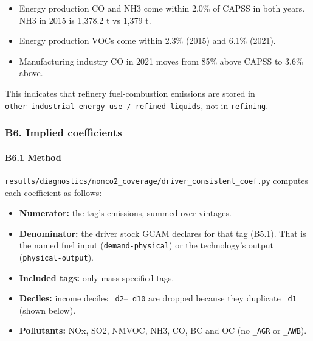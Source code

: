 \begin{itemize}
\tightlist
\item
  Energy
  production
  CO and
  NH3 come
  within
  2.0\% of
  CAPSS in
  both
  years.
  NH3 in
  2015 is
  1,378.2
  t vs
  1,379 t.
\item
  Energy
  production
  VOCs
  come
  within
  2.3\%
  (2015)
  and
  6.1\%
  (2021).
\item
  Manufacturing
  industry
  CO in
  2021
  moves
  from
  85\%
  above
  CAPSS to
  3.6\%
  above.
\end{itemize}

This
indicates
that
refinery
fuel-combustion
emissions
are stored
in
\texttt{other\ industrial\ energy\ use\ /\allowbreak{}\ refined\ liquids},
not in
\texttt{refining}.

\hypertarget{b6.-implied-coefficients}{%
\subsubsection{B6.
Implied
coefficients}\label{b6.-implied-coefficients}}

\hypertarget{b6.1-method}{%
\paragraph{B6.1
Method}\label{b6.1-method}}

\texttt{results/\allowbreak{}diagnostics/\allowbreak{}nonco2\_\allowbreak{}coverage/\allowbreak{}driver\_\allowbreak{}consistent\_\allowbreak{}coef.\allowbreak{}py}
computes
each
coefficient
as
follows:

\begin{itemize}
\tightlist
\item
  \textbf{Numerator:}
  the
  tag's
  emissions,
  summed
  over
  vintages.
\item
  \textbf{Denominator:}
  the
  driver
  stock
  GCAM
  declares
  for that
  tag
  (B5.1).
  That is
  the
  named
  fuel
  input
  (\texttt{demand-\allowbreak{}physical})
  or the
  technology's
  output
  (\texttt{physical-\allowbreak{}output}).
\item
  \textbf{Included
  tags:}
  only
  mass-specified
  tags.
\item
  \textbf{Deciles:}
  income
  deciles
  \texttt{\_\allowbreak{}d2}--\texttt{\_\allowbreak{}d10}
  are
  dropped
  because
  they
  duplicate
  \texttt{\_\allowbreak{}d1}
  (shown
  below).
\item
  \textbf{Pollutants:}
  NOx,
  SO2,
  NMVOC,
  NH3, CO,
  BC and
  OC (no
  \texttt{\_\allowbreak{}AGR}
  or
  \texttt{\_\allowbreak{}AWB}).
\end{itemize}

